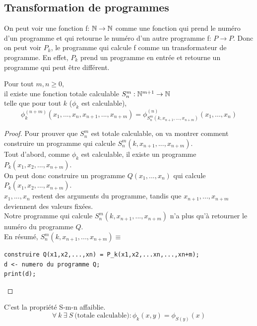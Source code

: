 \subsection{Transformation de programmes}
\label{ssub:transformation_de_programmes}
\begin{mydef}
	On peut voir une fonction f: $\mathbb{N} \rightarrow \mathbb{N}$ comme une fonction qui prend
	le numéro d'un programme et qui retourne le numéro d'un autre programme f: $P
	\rightarrow P$. Donc on peut voir $P_k$, le programme qui calcule f comme un
	transformateur de programme. En effet, $P_k$ prend un programme en entrée et
	retourne un programme qui peut être différent.
\end{mydef}

\begin{mytheo}[S-m-n]
	\label{S-m-n}Pour tout $m,n \geq 0$, \\
	il existe une fonction totale calculable $S^m_n : \mathbb{N}^{m+1} \rightarrow
	\mathbb{N}$ \\
	telle que pour tout $k$ ($\phi_k$ est calculable),
	$$ \phi^{(n+m)}_k(x_1,...,x_n,x_{n+1},...,x_{n+m}) =
	\phi^{(n)}_{S^m_n(k,x_{n+1}, ...,x_{n+m})} (x_1,...,x_n)$$
\end{mytheo}

\begin{proof}
	Pour prouver que $S^m_n$ est totale calculable, on va montrer comment construire un programme qui
	calcule  $S^m_n(k,x_{n+1}, ...,x_{n+m})$.\\
	Tout d'abord, comme $\phi_k$ est calculable, il existe un programme
	$P_k(x_1,x_2,...,x_{n+m})$.\\
	On peut donc construire un programme $Q(x_1,...,x_n)$ qui calcule
	$P_k(x_1,x_2,...,x_{n+m})$.\\
	$x_1,...,x_n$ restent des arguments du programme,
	tandis que $x_{n+1},...,x_{n+m}$ deviennent des valeurs fixées.\\
	Notre programme qui calcule $S^m_n(k,x_{n+1}, ...,x_{n+m})$ n'a plus
	qu'à retourner le numéro du programme $Q$.\\
       	En résumé, $S^m_n(k,x_{n+1},
	...,x_{n+m}) \equiv$
	\begin{lstlisting}
construire Q(x1,x2,...,xn) = P_k(x1,x2,...xn,...,xn+m);
d <- numero du programme Q;
print(d);
	\end{lstlisting}
\end{proof}

\begin{mytheo}[S]
	C'est la propriété S-m-n affaiblie.
	\[ \forall \ k \ \exists \ S \ \text{(totale calculable)} : \phi_k(x,y)=\phi_{S(y)}(x)\]
\end{mytheo}

